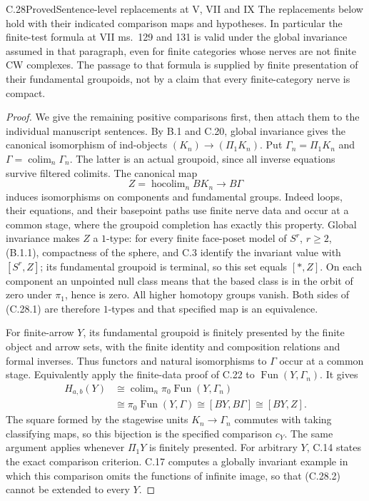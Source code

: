 \begin{claim}{C.28}{Proved}{Sentence-level replacements at V, VII and IX}
The replacements below hold with their indicated comparison maps
and hypotheses. In particular the finite-test formula at VII
ms.~129 and 131 is valid under the global invariance assumed in
that paragraph, even for finite categories whose nerves are not
finite CW complexes. The passage to that formula is supplied by
finite presentation of their fundamental groupoids, not by a
claim that every finite-category nerve is compact.
\end{claim}
\begin{proof}
We give the remaining positive comparisons first, then attach
them to the individual manuscript sentences. By B.1 and C.20,
global invariance gives the canonical isomorphism of ind-objects
$(K_n)\to(\Pi_1K_n)$. Put $\Gamma_n=\Pi_1K_n$ and
$\Gamma=\operatorname{colim}_n\Gamma_n$. The latter is an
actual groupoid, since all inverse equations survive filtered
colimits. The canonical map
\[
 Z=\operatorname{hocolim}_n BK_n\longrightarrow
                 B\Gamma
                                                               \tag{C.28.1}
\]
induces isomorphisms on components and fundamental groups. Indeed
loops, their equations, and their basepoint paths use finite
nerve data and occur at a common stage, where the groupoid
completion has exactly this property. Global invariance makes
$Z$ a $1$-type: for every finite face-poset model of $S^r$,
$r\geq2$, (B.1.1), compactness of the sphere, and C.3 identify
the invariant value with $[S^r,Z]$; its fundamental groupoid is
terminal, so this set equals $[*,Z]$. On each component an
unpointed null class means that the based class is in the orbit
of zero under $\pi_1$, hence is zero. All higher homotopy groups
vanish. Both sides of (C.28.1) are therefore $1$-types and that
specified map is an equivalence.

For finite-arrow $Y$, its fundamental groupoid is finitely
presented by the finite object and arrow sets, with the finite
identity and composition relations and formal inverses. Thus
functors and natural isomorphisms to $\Gamma$ occur at a common
stage. Equivalently apply the finite-data proof of C.22 to
$\operatorname{Fun}(Y,\Gamma_n)$. It gives
\[
 \begin{aligned}
 H_{a,b}(Y)
 &\cong\operatorname{colim}_n\pi_0\operatorname{Fun}(Y,\Gamma_n)\\
 &\cong\pi_0\operatorname{Fun}(Y,\Gamma)
 \cong[BY,B\Gamma]\cong[BY,Z].
 \end{aligned}                                                 \tag{C.28.2}
\]
The square formed by the stagewise units $K_n\to\Gamma_n$
commutes with taking classifying maps, so this bijection is the
specified comparison $c_Y$. The same argument applies whenever
$\Pi_1Y$ is finitely presented. For arbitrary $Y$, C.14 states
the exact comparison criterion. C.17 computes a globally invariant
example in which this comparison omits the functions of infinite
image, so that (C.28.2) cannot be extended to every $Y$.


\end{proof}
